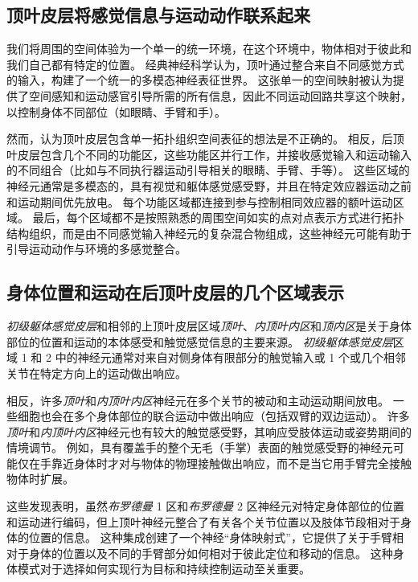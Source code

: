 \subsection{顶叶皮层将感觉信息与运动动作联系起来}

我们将周围的空间体验为一个单一的统一环境，在这个环境中，物体相对于彼此和我们自己都有特定的位置。
经典神经科学认为，顶叶通过整合来自不同感觉方式的输入，构建了一个统一的多模态神经表征世界。
这张单一的空间映射被认为提供了空间感知和运动感官引导所需的所有信息，因此不同运动回路共享这个映射，以控制身体不同部位（如眼睛、手臂和手）。


然而，认为顶叶皮层包含单一拓扑组织空间表征的想法是不正确的。
相反，后顶叶皮层包含几个不同的功能区，这些功能区并行工作，并接收感觉输入和运动输入的不同组合（比如与不同执行器运动引导相关的眼睛、手臂、手等）。
这些区域的神经元通常是多模态的，具有视觉和躯体感觉感受野，并且在特定效应器运动之前和运动期间优先放电。
每个功能区域都连接到参与控制相同效应器的额叶运动区域。
最后，每个区域都不是按照熟悉的周围空间如实的点对点表示方式进行拓扑结构组织，而是由不同感觉输入神经元的复杂混合物组成，这些神经元可能有助于引导运动动作与环境的多感觉整合。



\subsection{身体位置和运动在后顶叶皮层的几个区域表示}

\textit{初级躯体感觉皮层}和相邻的上顶叶皮层区域\textit{顶叶}、\textit{内顶叶内区}和\textit{顶内区}是关于身体部位的位置和运动的本体感受和触觉感觉信息的主要来源。
\textit{初级躯体感觉皮层}区域 1 和 2 中的神经元通常对来自对侧身体有限部分的触觉输入或 1 个或几个相邻关节在特定方向上的运动做出响应。


相反，许多\textit{顶叶}和\textit{内顶叶内区}神经元在多个关节的被动和主动运动期间放电。
一些细胞也会在多个身体部位的联合运动中做出响应（包括双臂的双边运动）。
许多\textit{顶叶}和\textit{内顶叶内区}神经元也有较大的触觉感受野，其响应受肢体运动或姿势期间的情境调节。
例如，具有覆盖手的整个无毛（手掌）表面的触觉感受野的神经元可能仅在手靠近身体时才对与物体的物理接触做出响应，而不是当它用手臂完全接触物体时扩展。


这些发现表明，虽然\textit{布罗德曼} 1 区和\textit{布罗德曼} 2 区神经元对特定身体部位的位置和运动进行编码，但上顶叶神经元整合了有关各个关节位置以及肢体节段相对于身体的位置的信息。
这种集成创建了一个神经“身体映射式”，它提供了关于手臂相对于身体的位置以及不同的手臂部分如何相对于彼此定位和移动的信息。
这种身体模式对于选择如何实现行为目标和持续控制运动至关重要。


